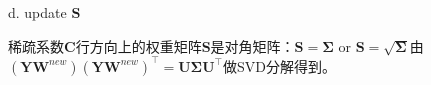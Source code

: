 \documentclass[10pt,twocolumn,letterpaper]{article}
\begin{document}
d. update $\mathbf{S}$

稀疏系数$\mathbf{C}$行方向上的权重矩阵$\mathbf{S}$是对角矩阵：$\mathbf{S}=\mathbf{\Sigma}$ or $\mathbf{S}=\sqrt{\mathbf{\Sigma}}$由$(\mathbf{Y}\mathbf{W}^{new})(\mathbf{Y}\mathbf{W}^{new})^{\top}=\mathbf{U}\mathbf{\Sigma}\mathbf{U}^{\top}$做SVD分解得到。






{
\small


}
\end{document}
